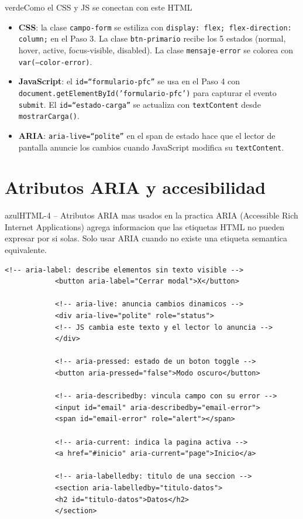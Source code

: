 \documentclass[11pt,a4paper]{article}
\begin{document}
	\begin{cajatip}{verde}{Como el CSS y JS se conectan con este HTML}
		\begin{itemize}[leftmargin=1.2em,itemsep=3pt]
			\item \textbf{CSS}: la clase \texttt{campo-form} se estiliza con \texttt{display: flex; flex-direction: column;} en el Paso 3. La clase \texttt{btn-primario} recibe los 5 estados (normal, hover, active, focus-visible, disabled). La clase \texttt{mensaje-error} se colorea con \texttt{var(--color-error)}.
			\item \textbf{JavaScript}: el \texttt{id=``formulario-pfc''} se usa en el Paso 4 con \texttt{document.getElementById('formulario-pfc')} para capturar el evento \texttt{submit}. El \texttt{id=``estado-carga''} se actualiza con \texttt{textContent} desde \texttt{mostrarCarga()}.
			\item \textbf{ARIA}: \texttt{aria-live=``polite''} en el span de estado hace que el lector de pantalla anuncie los cambios cuando JavaScript modifica su \texttt{textContent}.
		\end{itemize}
	\end{cajatip}
	
	\section{Atributos ARIA y accesibilidad}
	
	\begin{cajacodigo}{azul}{HTML-4 -- Atributos ARIA mas usados en la practica}
		{\color{codigotexto}\small ARIA (Accessible Rich Internet Applications) agrega informacion que las etiquetas HTML no pueden expresar por si solas. Solo usar ARIA cuando no existe una etiqueta semantica equivalente.}
		\begin{lstlisting}[style=codehtml]
			<!-- aria-label: describe elementos sin texto visible -->
			<button aria-label="Cerrar modal">X</button>
			
			<!-- aria-live: anuncia cambios dinamicos -->
			<div aria-live="polite" role="status">
			<!-- JS cambia este texto y el lector lo anuncia -->
			</div>
			
			<!-- aria-pressed: estado de un boton toggle -->
			<button aria-pressed="false">Modo oscuro</button>
			
			<!-- aria-describedby: vincula campo con su error -->
			<input id="email" aria-describedby="email-error">
			<span id="email-error" role="alert"></span>
			
			<!-- aria-current: indica la pagina activa -->
			<a href="#inicio" aria-current="page">Inicio</a>
			
			<!-- aria-labelledby: titulo de una seccion -->
			<section aria-labelledby="titulo-datos">
			<h2 id="titulo-datos">Datos</h2>
			</section>
		\end{lstlisting}
	\end{cajacodigo}
	
\end{document}
